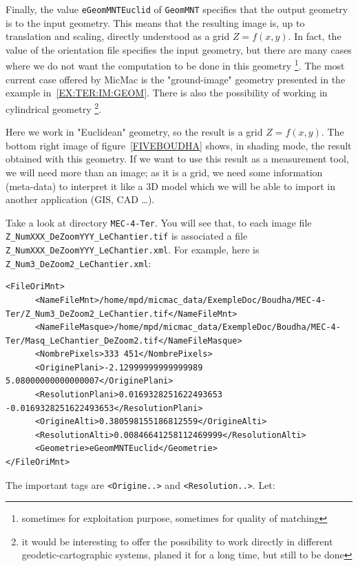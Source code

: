 Finally, the value {\tt eGeomMNTEuclid} of {\tt GeomMNT} specifies that the output 
geometry  is   to the input geometry.  This means that the resulting image
is, up to translation and scaling, directly understood as a grid $Z=f(x,y)$.
In fact, the value of the orientation file specifies the input geometry, but
there are many cases where we do
not want the computation to be done in this geometry \footnote{sometimes for exploitation
purpose, sometimes for quality of matching}. The most current case offered by MicMac
is the "ground-image" geometry presented in the example in~\ref{EX:TER:IM:GEOM}. There
is also the possibility of working in cylindrical geometry \footnote{it would be
interesting to offer the possibility to work directly in different geodetic-cartographic
systems, planed it for a long time, but still to be done}.

Here we work in "Euclidean" geometry, so the result is a grid $Z=f(x,y)$.
The bottom right image of figure~\ref{FIVEBOUDHA} shows, in shading mode,
the result obtained with this geometry. If we want to use this result
as a measurement tool, we will need more than an image; as it is a grid, we need some
information (meta-data)  to interpret it like a 3D model which we will
be able to import in another application (GIS, CAD \dots).

Take a look at directory {\tt MEC-4-Ter}. You will see that, to each
image file {\tt Z\_NumXXX\_DeZoomYYY\_LeChantier.tif} is associated a file
{\tt Z\_NumXXX\_DeZoomYYY\_LeChantier.xml}. For example, here is
{\tt Z\_Num3\_DeZoom2\_LeChantier.xml}:

{\scriptsize
\begin{verbatim}
<FileOriMnt>
      <NameFileMnt>/home/mpd/micmac_data/ExempleDoc/Boudha/MEC-4-Ter/Z_Num3_DeZoom2_LeChantier.tif</NameFileMnt>
      <NameFileMasque>/home/mpd/micmac_data/ExempleDoc/Boudha/MEC-4-Ter/Masq_LeChantier_DeZoom2.tif</NameFileMasque>
      <NombrePixels>333 451</NombrePixels>
      <OriginePlani>-2.12999999999999989 5.08000000000000007</OriginePlani>
      <ResolutionPlani>0.0169328251622493653 -0.0169328251622493653</ResolutionPlani>
      <OrigineAlti>0.380598155186812559</OrigineAlti>
      <ResolutionAlti>0.00846641258112469999</ResolutionAlti>
      <Geometrie>eGeomMNTEuclid</Geometrie>
</FileOriMnt>

\end{verbatim}
}

The important tags are {\tt <Origine..>} and {\tt <Resolution..>}. Let:

